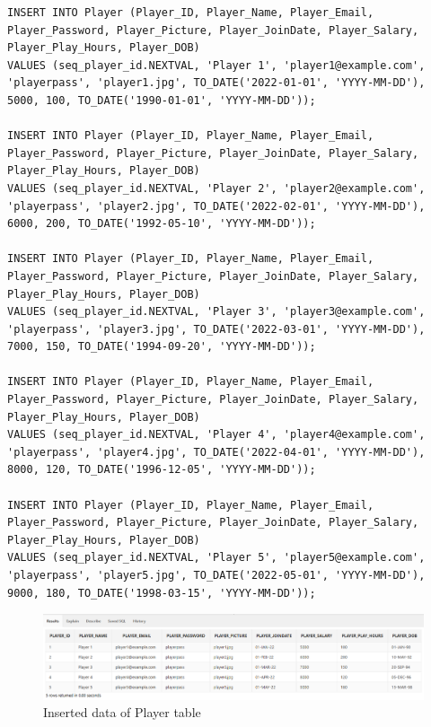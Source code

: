 \begin{lstlisting}[caption={Inserting data into Player tables},label={lst:insert_Player}]
INSERT INTO Player (Player_ID, Player_Name, Player_Email, Player_Password, Player_Picture, Player_JoinDate, Player_Salary, Player_Play_Hours, Player_DOB)
VALUES (seq_player_id.NEXTVAL, 'Player 1', 'player1@example.com', 'playerpass', 'player1.jpg', TO_DATE('2022-01-01', 'YYYY-MM-DD'), 5000, 100, TO_DATE('1990-01-01', 'YYYY-MM-DD'));

INSERT INTO Player (Player_ID, Player_Name, Player_Email, Player_Password, Player_Picture, Player_JoinDate, Player_Salary, Player_Play_Hours, Player_DOB)
VALUES (seq_player_id.NEXTVAL, 'Player 2', 'player2@example.com', 'playerpass', 'player2.jpg', TO_DATE('2022-02-01', 'YYYY-MM-DD'), 6000, 200, TO_DATE('1992-05-10', 'YYYY-MM-DD'));

INSERT INTO Player (Player_ID, Player_Name, Player_Email, Player_Password, Player_Picture, Player_JoinDate, Player_Salary, Player_Play_Hours, Player_DOB)
VALUES (seq_player_id.NEXTVAL, 'Player 3', 'player3@example.com', 'playerpass', 'player3.jpg', TO_DATE('2022-03-01', 'YYYY-MM-DD'), 7000, 150, TO_DATE('1994-09-20', 'YYYY-MM-DD'));

INSERT INTO Player (Player_ID, Player_Name, Player_Email, Player_Password, Player_Picture, Player_JoinDate, Player_Salary, Player_Play_Hours, Player_DOB)
VALUES (seq_player_id.NEXTVAL, 'Player 4', 'player4@example.com', 'playerpass', 'player4.jpg', TO_DATE('2022-04-01', 'YYYY-MM-DD'), 8000, 120, TO_DATE('1996-12-05', 'YYYY-MM-DD'));

INSERT INTO Player (Player_ID, Player_Name, Player_Email, Player_Password, Player_Picture, Player_JoinDate, Player_Salary, Player_Play_Hours, Player_DOB)
VALUES (seq_player_id.NEXTVAL, 'Player 5', 'player5@example.com', 'playerpass', 'player5.jpg', TO_DATE('2022-05-01', 'YYYY-MM-DD'), 9000, 180, TO_DATE('1998-03-15', 'YYYY-MM-DD'));
\end{lstlisting}
\begin{figure}[H]
    \centering
    \includegraphics[width=1\textwidth]{images/TableData/PLAYER.png}
    \caption{Inserted data of Player table}
\end{figure}



